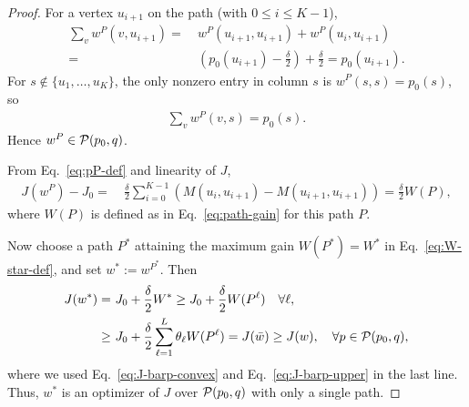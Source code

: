 \begin{proof}
For a vertex $u_{i+1}$ on the path (with $0\le i\le K-1$),
\begin{align*}
    \sum_v w^P(v,u_{i+1})
    = &~ w^P(u_{i+1},u_{i+1}) + w^P(u_i,u_{i+1})\\
    = &~ \left(p_0(u_{i+1})-\frac{\delta}{2}\right) + \frac{\delta}{2}
     = p_0(u_{i+1}).
\end{align*}
For $s\notin\{u_1,\dots,u_K\}$, the only nonzero entry in column $s$ is
$w^P(s,s)=p_0(s)$, so
\begin{align*}
    \sum_v w^P(v,s)=p_0(s).
\end{align*}
Hence $w^P\in\mathcal{P}(p_0,q)$.


From Eq.~\eqref{eq:pP-def} and linearity of $J$,
\begin{align}
    J(w^P) - J_0
    = &~ \frac{\delta}{2}\sum_{i=0}^{K-1}
       \left(
           M(u_i,u_{i+1}) - M(u_{i+1},u_{i+1})
       \right)
     = \frac{\delta}{2} W(P),
    \label{eq:J-pP}
\end{align}
where $W(P)$ is defined as in Eq.~\eqref{eq:path-gain} for this path $P$.

Now choose a path $P^*$ attaining the maximum gain $W(P^*)=W^*$ in Eq.~\eqref{eq:W-star-def}, and set $w^*:=w^{P^*}$.  Then
\begin{align}
    J(w^*)
    = &~ J_0 + \frac{\delta}{2} W^*
     \ge J_0 + \frac{\delta}{2} W(P^\ell)
     \quad\forall \ell,
     \notag\\
    \geq &~ J_0 + \frac{\delta}{2}\sum_{\ell=1}^L \theta_\ell W(P^\ell)
     = J(\bar w)
     \ge J(w),\quad \forall p\in\mathcal{P}(p_0,q),
    \label{eq:pstar-optimal}
\end{align}
where we used Eq.~\eqref{eq:J-barp-convex} and Eq.~\eqref{eq:J-barp-upper} in the
last line.  
Thus, $w^*$ is an optimizer of $J$ over $\mathcal{P}(p_0,q)$ with only a single path.



\end{proof}

